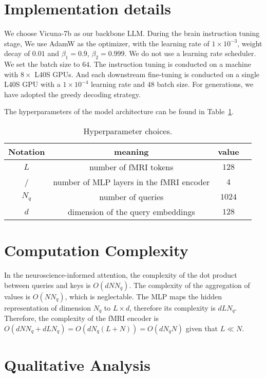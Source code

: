 \section{Implementation details} 
\label{app:impl}
We choose Vicuna-7b \cite{zheng2023judging} as our backbone LLM. During the brain instruction tuning stage, We use AdamW as the optimizer, with the learning rate of $1\times 10^{-3}$, weight decay of $0.01$ and $\beta_1=0.9$, $\beta_2=0.999$. We do not use a learning rate scheduler. We set the batch size to $64$. The instruction tuning is conducted on a machine with $8 \times$ L40S GPUs. And each downstream fine-tuning is conducted on a single L40S GPU with a $1\times 10^{-4}$ learning rate and $48$ batch size. For generations, we have adopted the greedy decoding strategy.

The hyperparameters of the model architecture can be found in Table~\ref{tab:hyper}.

\begin{table}[H]
    \caption{Hyperparameter choices.}
    \label{tab:hyper}
    \vskip 0.1in
    \centering
    \begin{tabular}{cccc}
    \toprule
        Notation & meaning & value \\
    \midrule
        $L$ & number of fMRI tokens & $128$ \\
        / & number of MLP layers in the fMRI encoder & $4$\\
        $N_q$ & number of queries & $1024$\\
        $d$ & dimension of the query embeddings & $128$ \\
        
    \bottomrule
    \end{tabular}
\end{table}

\section{Computation Complexity}
\label{app:complexity}
In the neuroscience-informed attention, the complexity of the dot product between queries and keys is $O(dNN_q)$. The complexity of the aggregation of values is $O(NN_q)$, which is neglectable. The MLP maps the hidden representation of dimension $N_q$ to $L \times d$, therefore its complexity is $dLN_q$. Therefore, the complexity of the fMRI encoder is $O(dNN_q + dLN_q) = O(dN_q(L + N)) = O(dN_qN)$ given that $L \ll N$.

\section{Qualitative Analysis}
\label{app:qual}

